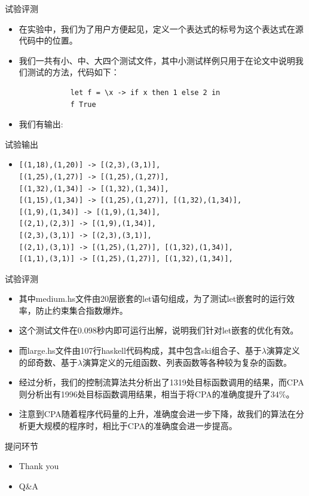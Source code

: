 \documentclass[9pt]{beamer}
\begin{document}
\begin{frame}[fragile]{试验评测}
	\begin{itemize}
		\item 在实验中，我们为了用户方便起见，定义一个表达式的标号为这个表达式在源代码中的位置。
		\vspace{0.3em}
		\item 	我们一共有小、中、大四个测试文件，其中小测试样例只用于在论文中说明我们测试的方法，代码如下：
		
	\begin{lstlisting}
	        let f = \x -> if x then 1 else 2 in
	        f True
	\end{lstlisting}
		\item 我们有输出:
	\end{itemize}
\end{frame}

\begin{frame}[fragile]{试验输出}
	\begin{itemize}
			\item\begin{lstlisting}
[(1,18),(1,20)] -> [(2,3),(3,1)],
[(1,25),(1,27)] -> [(1,25),(1,27)],
[(1,32),(1,34)] -> [(1,32),(1,34)],
[(1,15),(1,34)] -> [(1,25),(1,27)], [(1,32),(1,34)],
[(1,9),(1,34)] -> [(1,9),(1,34)],
[(2,1),(2,3)] -> [(1,9),(1,34)],
[(2,3),(3,1)] -> [(2,3),(3,1)],
[(2,1),(3,1)] -> [(1,25),(1,27)], [(1,32),(1,34)],
[(1,1),(3,1)] -> [(1,25),(1,27)], [(1,32),(1,34)],
	\end{lstlisting}

	\end{itemize}
\end{frame}

\begin{frame}[fragile]{试验评测}
	\begin{itemize}
		\item 其中medium.hs文件由20层嵌套的let语句组成，为了测试let嵌套时的运行效率，防止约束集合指数爆炸。
		\vspace{0.2em}
		\item 这个测试文件在0.098秒内即可运行出解，说明我们针对let嵌套的优化有效。
		\vspace{0.5em}
		\item 而large.hs文件由107行haskell代码构成，其中包含ski组合子、基于$\lambda$演算定义的邱奇数、基于$\lambda$演算定义的元组函数、列表函数等各种较为复杂的函数。
		\vspace{0.2em}
		\item 经过分析，我们的控制流算法共分析出了1319处目标函数调用的结果，而CPA则分析出有1996处目标函数调用结果，相当于将CPA的准确度提升了$34\%$。
		\vspace{0.2em}
		\item 注意到CPA随着程序代码量的上升，准确度会进一步下降，故我们的算法在分析更大规模的程序时，相比于CPA的准确度会进一步提高。
	\end{itemize}
\end{frame}

\begin{frame}[fragile]{提问环节}
	\begin{itemize}
		\item Thank you 
		\vspace{1em}
		\item Q\&A
	\end{itemize}
\end{frame}
\end{document}
